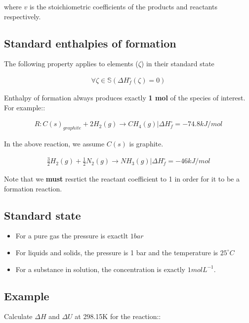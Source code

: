 \documentclass[12pt]{book}
\begin{document}
where $v$ is the stoichiometric coefficients of the products and reactants respectively.

\subsection*{Standard enthalpies of formation}

The following property applies to elements ($\zeta$) in their standard state

\begin{align*}
    \forall \zeta \in \mathbb{S}(\Delta H_f^{\circ}(\zeta)=0)
\end{align*}

Enthalpy of formation always produces exactly \textbf{1 mol} of the species of interest. For example::

\begin{align*}
    R: C(s)_{graphite}+2H_2(g)\rightarrow CH_4(g)|\Delta H_f^{\circ}=-74.8kJ/mol
\end{align*}

In the above reaction, we assume $C(s)$ is graphite.

\begin{align*}
    \frac{3}{2}H_2(g)+\frac{1}{2}N_2(g)\rightarrow NH_3(g)|\Delta H_f^{\circ}=-46 kJ/mol
\end{align*}

Note that we \textbf{must} resrtict the reactant coefficient to 1 in order for it to be a formation reaction.

\subsection*{Standard state}

\begin{itemize}
    \item For a pure gas the pressure is exactlt $1bar$
    \item For liquids and solids, the pressure is 1 bar and the temperature is $25^{\circ}C$
    \item For a substance in solution, the concentration is exactly $1molL^{-1}$.
\end{itemize}

\subsection*{Example}

Calculate $\Delta H$ and $\Delta U$ at 298.15K for the reaction::
\end{document}
